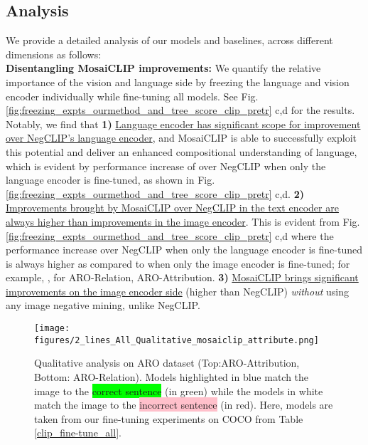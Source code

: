 \documentclass[11pt]{article}
\newcommand{\methodcomp}{MosaiCLIP}
\newcommand{\negclip}{NegCLIP}
\begin{document}
\subsection{Analysis}
\label{sec_analysis}
We provide a detailed analysis of our models and baselines, across different dimensions as follows:\\
\newline
\noindent\textbf{Disentangling \methodcomp{} improvements:}
We quantify the relative importance of the vision and language side by freezing the language and vision encoder individually while fine-tuning all models. See Fig. \ref{fig:freezing_expts_ourmethod_and_tree_score_clip_pretr} c,d for the results. 
Notably, we find that \textbf{1)} \uline{Language encoder has significant scope for improvement over \negclip{}'s language encoder}, and \methodcomp{} is able to successfully exploit this potential and deliver an enhanced compositional understanding of language, which is evident by performance increase of  over \negclip{} when only the language encoder is fine-tuned, as shown in Fig. \ref{fig:freezing_expts_ourmethod_and_tree_score_clip_pretr} c,d.
\textbf{2)} \uline{Improvements brought by \methodcomp{} over \negclip{} in the text encoder are always higher than improvements in the image encoder}. This is evident from Fig. \ref{fig:freezing_expts_ourmethod_and_tree_score_clip_pretr} c,d where the performance increase over \negclip{} when only the language encoder is fine-tuned is always higher as compared to when only the image encoder is fine-tuned; for example, ,  for ARO-Relation, ARO-Attribution.
\textbf{3)} \uline{\methodcomp{} brings significant improvements on the image encoder side} (higher than \negclip{}) \textit{without} using any image negative mining, unlike \negclip{}.
\begin{figure*}[h!]
    \centering
    {\texttt{[image: figures/2\_lines\_All\_Qualitative\_mosaiclip\_attribute.png]}}
    \caption{Qualitative analysis on ARO dataset (Top:ARO-Attribution, Bottom: ARO-Relation). Models highlighted in blue match the image to the \colorbox{lime}{correct sentence} (in green) while the models in white match the image to the \colorbox{pink}{incorrect sentence} (in red). Here, models are taken from our fine-tuning experiments on COCO from Table \ref{clip_fine-tune_all}.}
    \label{fig:quali_aro}
    \vspace{-1em}
    
\end{figure*}
\end{document}
